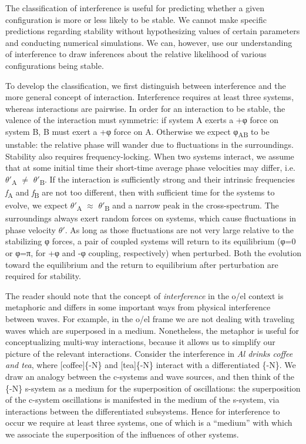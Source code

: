 The classification of interference is useful for predicting whether a given configuration is more or less likely to be stable. We cannot make specific predictions regarding stability without hypothesizing values of certain parameters and conducting numerical simulations. We can, however, use our understanding of interference to draw inferences about the relative likelihood of various configurations being stable.

  To develop the classification, we first distinguish between interference and the more general concept of interaction. Interference requires at least three systems, whereas interactions are pairwise. In order for an interaction to be stable, the valence of the interaction must symmetric: if system A exerts a +φ force on system B, B must exert a +φ force on A. Otherwise we expect φ\textsubscript{AB} to be unstable: the relative phase will wander due to fluctuations in the surroundings. Stability also requires frequency-locking. When two systems interact, we assume that at some initial time their short-time average phase velocities may differ, i.e. $\theta ′$\textsubscript{A} ${\neq}$ $\theta ′$\textsubscript{B}. If the interaction is sufficiently strong and their intrinsic frequencies \textit{f}\textsubscript{A} and \textit{f}\textsubscript{B} are not too different, then with sufficient time for the systems to evolve, we expect $\theta ′$\textsubscript{A} ${\approx}$ $\theta ′$\textsubscript{B} and a narrow peak in the cross-spectrum. The surroundings always exert random forces on systems, which cause fluctuations in phase velocity $\theta ′$. As long as those fluctuations are not very large relative to the stabilizing φ forces, a pair of coupled systems will return to its equilibrium (φ=0 or φ=π, for +φ and -φ coupling, respectively) when perturbed. Both the evolution toward the equilibrium and the return to equilibrium after perturbation are required for stability.

  The reader should note that the concept of \textit{interference} in the o/el context is metaphoric and differs in some important ways from physical interference between waves. For example, in the o/el frame we are not dealing with traveling waves which are superposed in a medium. Nonetheless, the metaphor is useful for conceptualizing multi-way interactions, because it allows us to simplify our picture of the relevant interactions. Consider the interference in \textit{Al drinks coffee and tea}, where [coffee]\{-N\} and [tea]\{-N\} interact with a differentiated \{-N\}. We draw an analogy between the c-systems and wave sources, and then think of the \{-N\} s-system as a medium for the superposition of oscillations: the superposition of the c-system oscillations is manifested in the medium of the s-system, via interactions between the differentiated subsystems. Hence for interference to occur we require at least three systems, one of which is a “medium” with which we associate the superposition of the influences of other systems. 

